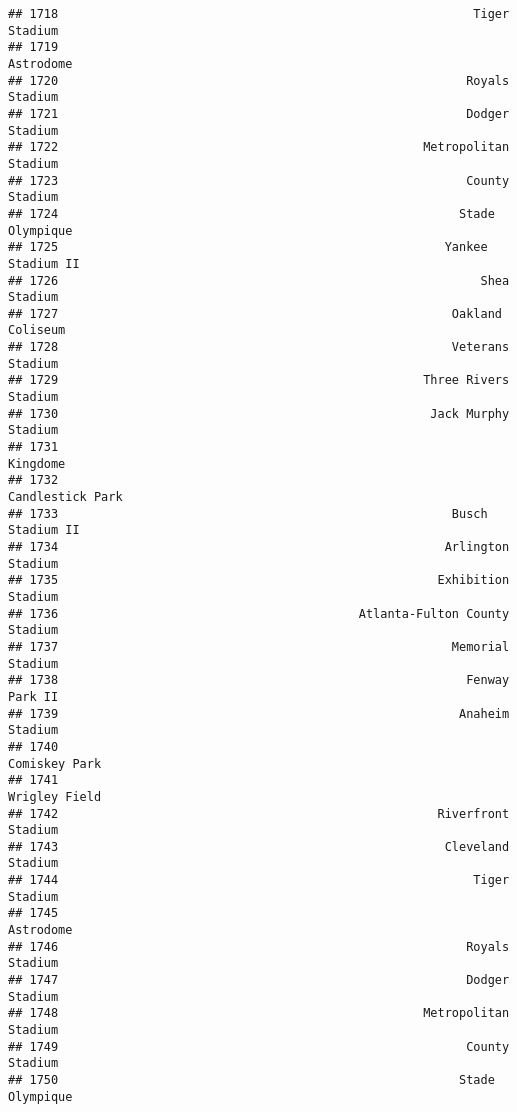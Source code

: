 \documentclass[]{article}
\begin{document}
\begin{verbatim}
## 1718                                                          Tiger Stadium
## 1719                                                              Astrodome
## 1720                                                         Royals Stadium
## 1721                                                         Dodger Stadium
## 1722                                                   Metropolitan Stadium
## 1723                                                         County Stadium
## 1724                                                        Stade Olympique
## 1725                                                      Yankee Stadium II
## 1726                                                           Shea Stadium
## 1727                                                       Oakland Coliseum
## 1728                                                       Veterans Stadium
## 1729                                                   Three Rivers Stadium
## 1730                                                    Jack Murphy Stadium
## 1731                                                               Kingdome
## 1732                                                       Candlestick Park
## 1733                                                       Busch Stadium II
## 1734                                                      Arlington Stadium
## 1735                                                     Exhibition Stadium
## 1736                                          Atlanta-Fulton County Stadium
## 1737                                                       Memorial Stadium
## 1738                                                         Fenway Park II
## 1739                                                        Anaheim Stadium
## 1740                                                          Comiskey Park
## 1741                                                          Wrigley Field
## 1742                                                     Riverfront Stadium
## 1743                                                      Cleveland Stadium
## 1744                                                          Tiger Stadium
## 1745                                                              Astrodome
## 1746                                                         Royals Stadium
## 1747                                                         Dodger Stadium
## 1748                                                   Metropolitan Stadium
## 1749                                                         County Stadium
## 1750                                                        Stade Olympique

\end{verbatim}
\end{document}
